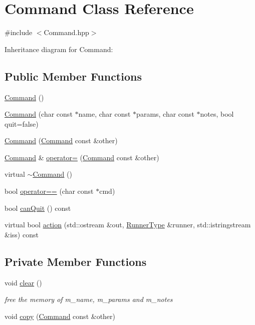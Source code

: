 \hypertarget{classCommand}{}\section{Command Class Reference}
\label{classCommand}


{\ttfamily \#include $<$Command.\+hpp$>$}



Inheritance diagram for Command\+:
\subsection*{Public Member Functions}
\begin{DoxyCompactItemize}
\item 
\hyperlink{classCommand_a18df2d81039392daeb0b78c346a70537}{Command} ()
\item 
\hyperlink{classCommand_ac26b14828c5a72f9bd370421a4788b5d}{Command} (char const $\ast$name, char const $\ast$params, char const $\ast$notes, bool quit=false)
\item 
\hyperlink{classCommand_a8ccab91a784c447f628ee8fec3873494}{Command} (\hyperlink{classCommand}{Command} const \&other)
\item 
\hyperlink{classCommand}{Command} \& \hyperlink{classCommand_a378451c967b9d585492a778bab58f803}{operator=} (\hyperlink{classCommand}{Command} const \&other)
\item 
virtual \hyperlink{classCommand_ab552bb3a07fdd1acbfd8ea76e69b2278}{$\sim$\+Command} ()
\item 
bool \hyperlink{classCommand_a75d6d67687c9d29e47ce9e80540bbd1e}{operator==} (char const $\ast$cmd)
\item 
bool \hyperlink{classCommand_a0ec10c9753786caf083aba08cf85afb0}{can\+Quit} () const
\item 
virtual bool \hyperlink{classCommand_ac423f5674fc858c0cc42f494943bc0d0}{action} (std\+::ostream \&out, \hyperlink{Command_8hpp_a3594ceaf3c835811a9a67810e7af19f9}{Runner\+Type} \&runner, std\+::istringstream \&iss) const
\end{DoxyCompactItemize}
\subsection*{Private Member Functions}
\begin{DoxyCompactItemize}
\item 
void \hyperlink{classCommand_a57fbea0c0d10ef4b184c7ef3eb34590d}{clear} ()
\begin{DoxyCompactList}\small\item\em free the memory of m\+\_\+name, m\+\_\+params and m\+\_\+notes \end{DoxyCompactList}\item 
void \hyperlink{classCommand_afc097ed76cb9fd7135146ec8703e2c3e}{copy} (\hyperlink{classCommand}{Command} const \&other)
\end{DoxyCompactItemize}
